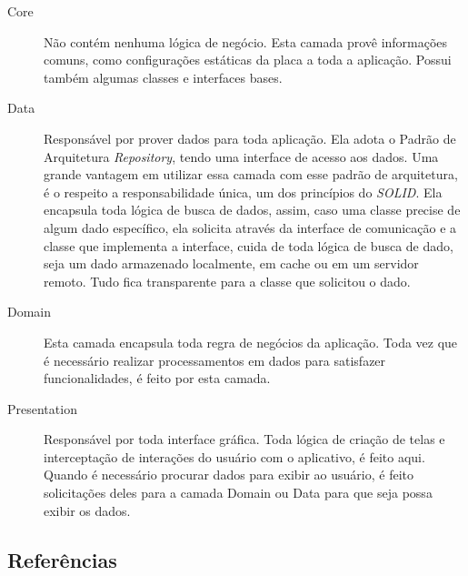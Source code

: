 \documentclass[a4paper, 12pt]{article}
\begin{document}
\begin{description}

\item[Core] Não contém nenhuma lógica de negócio. Esta camada provê informações comuns, como configurações estáticas da placa a toda a aplicação. Possui também algumas classes e interfaces bases.

\item[Data] Responsável por prover dados para toda aplicação. Ela adota o Padrão de Arquitetura \textit{Repository}, tendo uma interface de acesso aos dados. Uma grande vantagem em utilizar essa camada com esse padrão de arquitetura, é o respeito a responsabilidade única, um dos princípios do \textit{SOLID}. Ela encapsula toda lógica de busca de dados, assim, caso uma classe precise de algum dado específico, ela solicita através da interface de comunicação e a classe que implementa a interface, cuida de toda lógica de busca de dado, seja um dado armazenado localmente, em cache ou em um servidor remoto. Tudo fica transparente para a classe que solicitou o dado.

\item[Domain] Esta camada encapsula toda regra de negócios da aplicação. Toda vez que é necessário realizar processamentos em dados para satisfazer funcionalidades, é feito por esta camada.

\item[Presentation] Responsável por toda interface gráfica. Toda lógica de criação de telas e interceptação de interações do usuário com o aplicativo, é feito aqui. Quando é necessário procurar dados para exibir ao usuário, é feito solicitações deles para a camada Domain ou Data para que seja possa exibir os dados.
 
\end{description}

\subsection{Referências}
\end{document}
